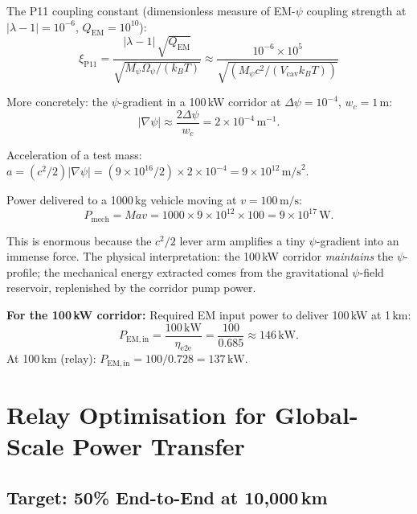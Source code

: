 \documentclass[aps,prd,twocolumn,superscriptaddress]{revtex4-2}
\begin{document}
The P11 coupling constant (dimensionless measure of EM-$\psi$
coupling strength at $|\lambda-1| = 10^{-6}$, $Q_\mathrm{EM} = 10^{10}$):
\begin{equation}
\xi_\mathrm{P11} = \frac{|\lambda-1|\,\sqrt{Q_\mathrm{EM}}}{\sqrt{M_\psi\Omega_\psi/(k_BT)}}
\approx \frac{10^{-6}\times10^5}{\sqrt{(M_\psi c^2/(V_\mathrm{cav}k_BT))}}
\end{equation}

More concretely: the $\psi$-gradient in a 100\,kW corridor at
$\Delta\psi = 10^{-4}$, $w_c = 1\,\mathrm{m}$:
\begin{equation}
|\nabla\psi| \approx \frac{2\Delta\psi}{w_c} = 2\times10^{-4}\,\mathrm{m}^{-1}.
\end{equation}

Acceleration of a test mass: $a = (c^2/2)|\nabla\psi|
= (9\times10^{16}/2)\times2\times10^{-4} = 9\times10^{12}\,\mathrm{m/s}^2$.

Power delivered to a 1000\,kg vehicle moving at $v = 100\,\mathrm{m/s}$:
\begin{equation}
P_\mathrm{mech} = Mav = 1000\times9\times10^{12}\times100
= 9\times10^{17}\,\mathrm{W}.
\end{equation}

This is enormous because the $c^2/2$ lever arm amplifies a tiny
$\psi$-gradient into an immense force.  The physical interpretation:
the 100\,kW corridor \emph{maintains} the $\psi$-profile; the
mechanical energy extracted comes from the gravitational $\psi$-field
reservoir, replenished by the corridor pump power.

\textbf{For the 100\,kW corridor:}
Required EM input power to deliver 100\,kW at 1\,km:
\begin{equation}
P_\mathrm{EM,in} = \frac{100\,\mathrm{kW}}{\eta_\mathrm{e2e}}
= \frac{100}{0.685} \approx 146\,\mathrm{kW}.
\end{equation}
At 100\,km (relay): $P_\mathrm{EM,in} = 100/0.728 = 137\,\mathrm{kW}$.

\section{Relay Optimisation for Global-Scale Power Transfer}
\label{sec:relay}

\subsection{Target: 50\% End-to-End at 10,000\,km}
\end{document}
